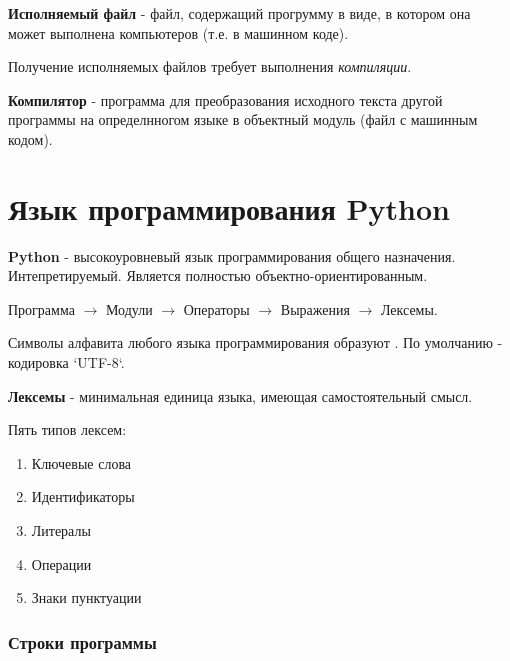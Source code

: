 
\begin{definition}
  \textbf{Исполняемый файл} - файл, содержащий прогрумму в виде, в котором она может выполнена компьютеров (т.е. в машинном коде).
\end{definition}

Получение исполняемых файлов требует выполнения \textit{компиляции}.

\begin{definition}
  \textbf{Компилятор} - программа для преобразования исходного текста другой программы на определнногом языке в объектный модуль (файл с машинным кодом).
\end{definition}

\section{Язык программирования Python}

\begin{definition}
  \textbf{Python} - высокоуровневый язык программирования общего назначения. Интепретируемый. Является полностью объектно-ориентированным.
\end{definition}

Программа $\to $ Модули $\to $ Операторы $\to $ Выражения $\to $ Лексемы.

\begin{definition}
  Символы алфавита любого языка программирования образуют . По умолчанию - кодировка `UTF-8`.
\end{definition}

\begin{definition}
  \textbf{Лексемы} - минимальная единица языка, имеющая самостоятельный смысл.
\end{definition}

Пять типов лексем:
\begin{enumerate} 
  \item Ключевые слова
  \item Идентификаторы
  \item Литералы
  \item Операции
  \item Знаки пунктуации
\end{enumerate}

\subsubsection*{Строки программы}

